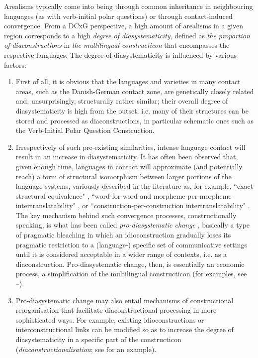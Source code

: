 \documentclass[output=paper]{langsci/langscibook}
\begin{document}
Arealisms typically come into being through common inheritance in neighbouring languages (as with verb-initial polar questions) or through contact-in\-duced convergence. From a DCxG perspective, a high amount of arealisms in a given region corresponds to a high \textit{degree of diasystematicity}, defined as \textit{the proportion of diaconstructions} in \textit{the multilingual constructicon} that encompasses the respective languages. The degree of diasystematicity is influenced by various factors:

\begin{enumerate}
 \item First of all, it is obvious that the languages and varieties in many contact areas, such as the Danish-German contact zone, are genetically closely related and, unsurprisingly, structurally rather similar; their overall degree of diasystematicity is high from the outset, i.e. many of their structures can be stored and processed as diaconstructions, in particular schematic ones such as the Verb-Initial Polar Question Construction.

 \item Irrespectively of such pre-existing similarities, intense language contact will result in an increase in diasystematicity. It has often been observed that, given enough time, languages in contact will approximate (and potentially reach) a form of structural isomorphism between larger portions of the language systems, variously described in the literature as, for example, “exact structural equivalence" \citep[179--180]{Heine.2005}, “word-for-word and morpheme-per-morpheme intertranslatability" \citep[28]{Aikhenvald.2006}, or “construction-per-construction intertranslatability" \citep[149]{Hoder.2014}. The key mechanism behind such convergence processes, constructionally speaking, is what has been called \textit{pro-diasystematic change} \citep[59--62]{Hoder.2018}, basically a type of pragmatic bleaching in which an idio\-con\-struction gradually loses its pragmatic restriction to a \mbox{(language-)} specific set of communicative settings until it is considered acceptable in a wider range of contexts, i.e. as a diaconstruction. Pro-diasystematic change, then, is essentially an economic process, a simplification of the multilingual constructicon (for examples, see --).

 \item Pro-diasystematic change may also entail mechanisms of constructional reorganisation that facilitate diaconstructional processing in more sophisticated ways. For example, existing idioconstructions or interconstructional links can be modified so as to increase the degree of diasystematicity in a specific part of the constructicon (\textit{diaconstructionalisation}; see  for an example).


\end{enumerate}
\end{document}

